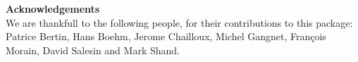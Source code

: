 \clearpage



\clearpage

{\Large \bf Acknowledgements}\\

We are thankfull to the following people, for their contributions
to this package:
Patrice Bertin, Hans Boehm, Jerome Chailloux, Michel Gangnet, 
Fran\c{c}ois Morain, David Salesin and Mark Shand.

\vspace{2cm}

\tableofcontents

\clearpage
\printindex


